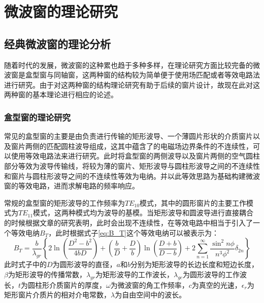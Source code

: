 \documentclass[master]{thesis-uestc}
\begin{document}
\chapter{微波窗的理论研究}
\section{经典微波窗的理论分析}
随着时代的发展，微波窗的这种累也趋于多种多样，在理论研究方面比较完备的微波窗是盒型窗与同轴窗，这两种窗的结构较为简单便于使用场匹配或者等效电路法进行研究。由于对这两种窗的结构理论研究有助于后续的窗片设计，故现在此对这两种窗的基本理论进行相应的论述。
\subsection{盒型窗的理论研究}
常见的盒型窗的主要是由负责进行传输的矩形波导、一个薄圆片形状的介质窗片以及窗片两侧的匹配圆柱波导组成，这其中蕴含了的电磁场边界条件的不连续性，可以使用等效电路法来进行研究。此时将盒型窗的两侧波导以及窗片两侧的空气圆柱部分等效为波导传输线，将较为薄的窗片、矩形波导与圆柱形波导之间的不连续性和窗片与圆柱形波导之间的不连续性等效为电纳。并以此等效思路为基础构建微波窗的等效电路，进而求解电路的频率响应。

常规的盒型窗的矩形波导的工作频率为$TE_{10}$模式，其中的圆形窗片的主要工作模式为$TE_{11}$模式，这两种模式均为波导的基模。当矩形波导和圆波导进行直接耦合的时候根据文章的研究表明，此时会出现不连续性，在等效电路中相当于引入了一个等效电纳$B_{T}$，此时根据式子\ref{eq:B_T}这个等效电纳可以被表示为：
\begin{equation}\label{eq:B_T}
    B_{T}=\frac{b}{\lambda_{g r}}\left\{2 \ln \left(\frac{D^{2}-b^{2}}{4 b D}\right)+\left(\frac{b}{D}+\frac{D}{b}\right) \ln \left(\frac{D+b}{D-b}\right)+2 \sum_{n=1}^{\infty} \frac{\sin ^{2} n \phi}{n^{3} \phi^{2}} \delta_{2 n}\right\}
\end{equation}
此时式子中的$D$为圆形波导的直径，$a$和$b$分别为矩形波导的长边长度和短边长度，$\beta$为矩形波导的传播常数，$\lambda_{g r}$为矩形波导的工作波长，$\lambda_{g c}$为圆形波导的工作波长，$t$为圆柱形介质窗片的厚度，$\omega$为微波窗的角工作频率，$c$为真空的光速，$\epsilon_{r}$为矩形窗片介质片的相对介电常数，$\lambda$为自由空间中的波长。
\end{document}
